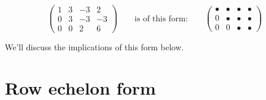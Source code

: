 \documentclass{ximera}
\begin{document}
\[
\begin{pmatrix}
  1 &   3 & -3 & 2  \\
  0 &   3 & -3 & -3 \\
  0& 0  & 2 & 6
\end{pmatrix}
\qquad
\text{is of this form:}
\qquad
\begin{pmatrix}
  \bullet & \bullet & \bullet & \bullet \\
     0   & \bullet & \bullet & \bullet \\
     0  &    0 & \bullet & \bullet
\end{pmatrix}
\]



We'll discuss the implications of this form below.


\section{Row echelon form}
\end{document}
